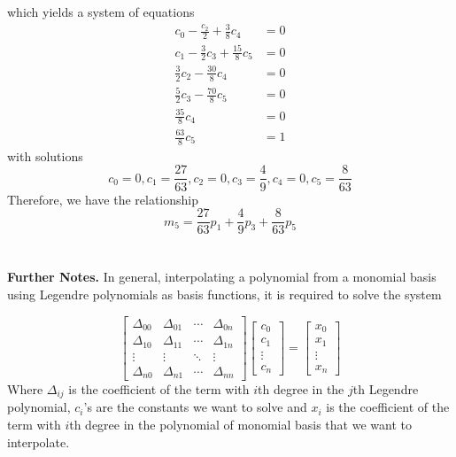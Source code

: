 which yields a system of equations
\begin{align*}
c_0-\frac{c_2}{2} + \frac{3}{8}c_4 &= 0\\
c_1-\frac{3}{2}c_3 + \frac{15}{8}c_5 &= 0\\
\frac{3}{2}c_2 - \frac{30}{8}c_4 &= 0\\
\frac{5}{2}c_3 - \frac{70}{8}c_5 &= 0\\
\frac{35}{8}c_4 &= 0\\
\frac{63}{8}c_5 &= 1
\end{align*}
with solutions
\begin{equation*}
c_0 = 0, c_1 = \frac{27}{63}, c_2 = 0, c_3 = \frac{4}{9}, c_4 = 0, c_5 = \frac{8}{63}
\end{equation*}
Therefore, we have the relationship
\begin{equation*}
\boxed{m_5 = \frac{27}{63}p_1 + \frac{4}{9}p_3 + \frac{8}{63}p_5}
\end{equation*}
\\
\\
\textbf{Further Notes.} In general, interpolating a polynomial from a monomial basis using Legendre polynomials as basis functions, it is required to solve the system

\begin{equation*}
\begin{bmatrix}
\Delta_{00} & \Delta_{01} & \cdots & \Delta_{0n}\\
\Delta_{10} & \Delta_{11} & \cdots & \Delta_{1n}\\
\vdots & \vdots & \ddots & \vdots\\
\Delta_{n0} & \Delta_{n1} & \cdots & \Delta_{nn}
\end{bmatrix}
\begin{bmatrix}
c_0\\
c_1\\
\vdots\\
c_n
\end{bmatrix}
=
\begin{bmatrix}
x_0\\
x_1\\
\vdots\\
x_n
\end{bmatrix}
\end{equation*}
Where $\Delta_{ij}$ is the coefficient of the term with $i$th degree in the $j$th Legendre polynomial, $c_i$'s are the constants we want to solve and $x_i$ is the coefficient of the term with $i$th degree in the polynomial of monomial basis that we want to interpolate.

